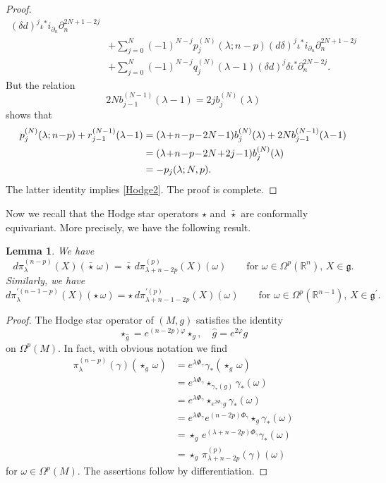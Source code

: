 \documentclass[a4paper,12pt,reqno]{amsart}
\newtheorem{lem}[theorem]{Lemma}
\numberwithin{theorem}{subsection}
\numberwithin{equation}{section}
\begin{document}
\begin{proof}
\begin{align*}
   (\delta{d})^j \iota^* i_{\partial_n} \partial_n^{2N+1-2j} \\
   & + \sum_{j=0}^N(-1)^{N-j}p_j^{(N)}(\lambda;n\!-\!p) ({d}\delta)^j \iota^* i_{\partial_n} \partial_n^{2N+1-2j} \\
   & +\sum_{j=0}^N(-1)^{N-j} q_j^{(N)}(\lambda\!-\!1) (\delta{d})^j \delta \iota^*\partial_n^{2N-2j}.
\end{align*}
But the relation
$$
   2N b_{j-1}^{(N-1)}(\lambda\!-\!1)=2j b_j^{(N)}(\lambda)
$$
shows that
\begin{align*}\label{help-sum}
   p_j^{(N)}(\lambda;n\!-\!p) + r_{j-1}^{(N-1)}(\lambda\!-\!1) & =
   (\lambda\!+\!n\!-\!p\!-\!2N\!-\!1) b_j^{(N)}(\lambda) + 2N b_{j-1}^{(N-1)}(\lambda\!-\!1) \notag \\
   & = (\lambda\!+\!n\!-\!p\!-\!2N\!+\!2j\!-\!1) b_j^{(N)}(\lambda) \notag \\
   & = -p_j(\lambda;N,p).
\end{align*}
The latter identity implies \eqref{Hodge2}. The proof is complete.
\end{proof}

Now we recall that the Hodge star operators $\star$ and $\bar{\star}$ are
conformally equivariant. More precisely, we have the following result.

\begin{lem}\label{Hodge-covariant} We have
$$
   {d} \pi_\lambda^{(n-p)}(X) (\bar{\star} \, \omega) = \bar{\star} \,
   {d} \pi^{(p)}_{\lambda+n-2p}(X) (\omega) \qquad \mbox{for $\omega \in \Omega^p({\mathbb{R}}^n)$, $X \in {{\mathfrak g}}$}.
$$
Similarly, we have
$$
   {d} \pi_\lambda^{\prime (n-1-p)}(X) (\star \, \omega) = \star \,
   {d} \pi^{\prime (p)}_{\lambda+n-1-2p}(X) (\omega) \qquad \mbox{for $\omega \in \Omega^p({\mathbb{R}}^{n-1})$,
   $X \in {{\mathfrak g}}^\prime$}.
$$
\end{lem}

\begin{proof} The Hodge star operator of $(M,g)$ satisfies the identity
$$
   \star_{\hat{g}} = e^{(n-2p)\varphi} \star_g, \quad \hat{g} = e^{2\varphi} g
$$
on $\Omega^p(M)$. In fact, with obvious notation we find
\begin{align*}
    \pi_\lambda^{(n-p)}(\gamma) (\star_g \, \omega) & = e^{\lambda \Phi_\gamma}
    \gamma_* (\star_g \, \omega) \\
    & = e^{\lambda \Phi_\gamma} \star_{\gamma_*(g)} \gamma_*(\omega) \\
    & = e^{\lambda \Phi_\gamma} \star_{e^{2\Phi_\gamma}g} \gamma_*(\omega) \\
    & = e^{\lambda \Phi_\gamma} e^{(n-2p)\Phi_\gamma} \star_g \gamma_*(\omega) \\
    & = \star_g \, e^{(\lambda+n-2p)\Phi_\gamma} \gamma_*(\omega) \\
    & = \star_g \, \pi_{\lambda+n-2p}^{(p)}(\gamma)(\omega)
\end{align*}
for $\omega \in \Omega^p(M)$. The assertions follow by differentiation.
\end{proof}
\end{document}
